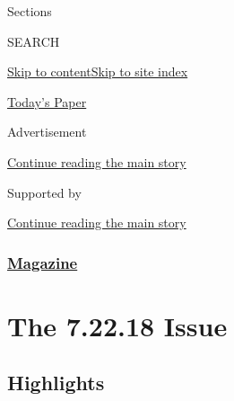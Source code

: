 Sections

SEARCH

\protect\hyperlink{site-content}{Skip to
content}\protect\hyperlink{site-index}{Skip to site index}

\href{https://myaccount.nytimes3xbfgragh.onion/auth/login?response_type=cookie\&client_id=vi}{}

\href{https://www.nytimes3xbfgragh.onion/section/todayspaper}{Today's
Paper}

Advertisement

\protect\hyperlink{after-top}{Continue reading the main story}

Supported by

\protect\hyperlink{after-sponsor}{Continue reading the main story}

\hypertarget{magazine}{%
\subsubsection{\texorpdfstring{\href{/section/magazine}{Magazine}}{Magazine}}\label{magazine}}

\hypertarget{the-72218-issue}{%
\section{The 7.22.18 Issue}\label{the-72218-issue}}

\hypertarget{highlights}{%
\subsection{Highlights}\label{highlights}}

